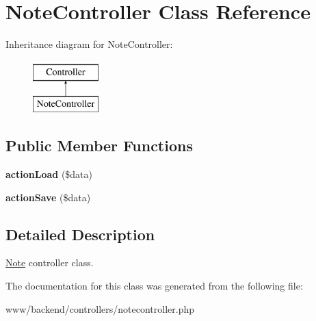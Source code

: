 \hypertarget{classNoteController}{
\section{NoteController Class Reference}
\label{classNoteController}
}
Inheritance diagram for NoteController:\begin{figure}[H]
\begin{center}
\leavevmode
\includegraphics[height=2.000000cm]{classNoteController}
\end{center}
\end{figure}
\subsection*{Public Member Functions}
\begin{DoxyCompactItemize}
\item 
\hypertarget{classNoteController_a70a266f1601d67ef3f2b98473a50f711}{
{\bfseries actionLoad} (\$data)}
\label{classNoteController_a70a266f1601d67ef3f2b98473a50f711}

\item 
\hypertarget{classNoteController_ad5e5e2f53534b34885e39c7f553ab6e7}{
{\bfseries actionSave} (\$data)}
\label{classNoteController_ad5e5e2f53534b34885e39c7f553ab6e7}

\end{DoxyCompactItemize}


\subsection{Detailed Description}
\hyperlink{classNote}{Note} controller class. 

The documentation for this class was generated from the following file:\begin{DoxyCompactItemize}
\item 
www/backend/controllers/notecontroller.php\end{DoxyCompactItemize}
